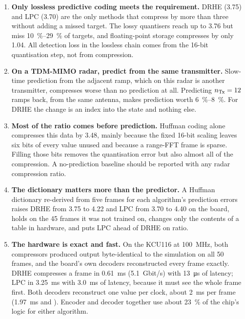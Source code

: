 \begin{enumerate}
\item \textbf{Only lossless predictive coding meets the requirement.} DRHE
(\num{3.75}) and LPC (\num{3.70}) are the only methods that compress by more
than three without adding a missed target. The lossy quantisers reach up to
\num{3.76} but miss \SIrange{10}{29}{\percent} of targets, and floating-point
storage compresses by only \num{1.04}. All detection loss in the lossless chain
comes from the 16-bit quantisation step, not from compression.

\item \textbf{On a TDM-MIMO radar, predict from the same transmitter.} Slow-time
prediction from the adjacent ramp, which on this radar is another transmitter,
compresses worse than no prediction at all. Predicting $n_{\mathrm{Tx}} = 12$ ramps back,
from the same antenna, makes prediction worth \SIrange{6}{8}{\percent}. For
DRHE the change is an index into the state and nothing else.

\item \textbf{Most of the ratio comes before prediction.} Huffman coding alone
compresses this data by \num{3.48}, mainly because the fixed 16-bit scaling
leaves six bits of every value unused and because a range-FFT frame is sparse.
Filling those bits removes the quantisation error but also almost all of the
compression. A no-prediction baseline should be reported with any radar
compression ratio.

\item \textbf{The dictionary matters more than the predictor.} A Huffman
dictionary re-derived from five frames for each algorithm's prediction errors
raises DRHE from \num{3.75} to \num{4.22} and LPC from \num{3.70} to \num{4.40}
on the board, holds on the 45 frames it was not trained on, changes only the
contents of a table in hardware, and puts LPC ahead of DRHE on ratio.

\item \textbf{The hardware is exact and fast.} On the KCU116 at
\SI{100}{\mega\hertz}, both compressors produced output byte-identical to the
simulation on all 50 frames, and the board's own decoders reconstructed every
frame exactly. DRHE
compresses a frame in \SI{0.61}{\milli\second} (\SI{5.1}{Gbit/s}) with
\SI{13}{\micro\second} of latency; LPC in \SI{3.25}{\milli\second} with
\SI{3.0}{\milli\second} of latency, because it must see the whole frame first.
Both decoders reconstruct one value per clock, about \SI{2}{\milli\second} per
frame (\SI{1.97}{\milli\second} and \lpcDecTime).
Encoder and decoder together use about \SI{23}{\percent} of the chip's logic
for either algorithm.


\end{enumerate}
